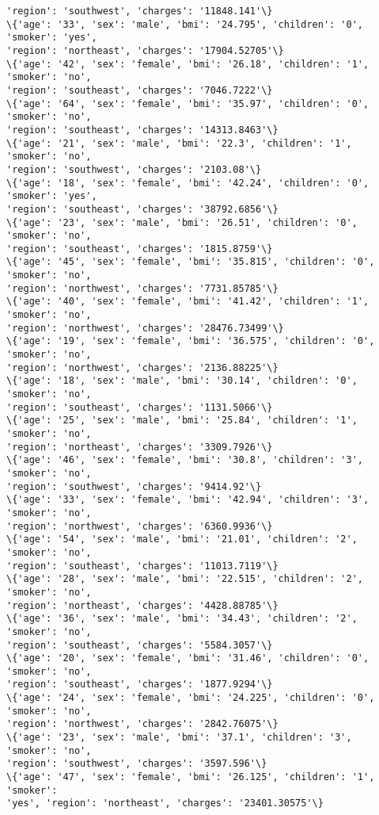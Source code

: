 \documentclass[11pt]{article}
\begin{document}
\begin{Verbatim}[commandchars=\\\{\}]
'region': 'southwest', 'charges': '11848.141'\}
\{'age': '33', 'sex': 'male', 'bmi': '24.795', 'children': '0', 'smoker': 'yes',
'region': 'northeast', 'charges': '17904.52705'\}
\{'age': '42', 'sex': 'female', 'bmi': '26.18', 'children': '1', 'smoker': 'no',
'region': 'southeast', 'charges': '7046.7222'\}
\{'age': '64', 'sex': 'female', 'bmi': '35.97', 'children': '0', 'smoker': 'no',
'region': 'southeast', 'charges': '14313.8463'\}
\{'age': '21', 'sex': 'male', 'bmi': '22.3', 'children': '1', 'smoker': 'no',
'region': 'southwest', 'charges': '2103.08'\}
\{'age': '18', 'sex': 'female', 'bmi': '42.24', 'children': '0', 'smoker': 'yes',
'region': 'southeast', 'charges': '38792.6856'\}
\{'age': '23', 'sex': 'male', 'bmi': '26.51', 'children': '0', 'smoker': 'no',
'region': 'southeast', 'charges': '1815.8759'\}
\{'age': '45', 'sex': 'female', 'bmi': '35.815', 'children': '0', 'smoker': 'no',
'region': 'northwest', 'charges': '7731.85785'\}
\{'age': '40', 'sex': 'female', 'bmi': '41.42', 'children': '1', 'smoker': 'no',
'region': 'northwest', 'charges': '28476.73499'\}
\{'age': '19', 'sex': 'female', 'bmi': '36.575', 'children': '0', 'smoker': 'no',
'region': 'northwest', 'charges': '2136.88225'\}
\{'age': '18', 'sex': 'male', 'bmi': '30.14', 'children': '0', 'smoker': 'no',
'region': 'southeast', 'charges': '1131.5066'\}
\{'age': '25', 'sex': 'male', 'bmi': '25.84', 'children': '1', 'smoker': 'no',
'region': 'northeast', 'charges': '3309.7926'\}
\{'age': '46', 'sex': 'female', 'bmi': '30.8', 'children': '3', 'smoker': 'no',
'region': 'southwest', 'charges': '9414.92'\}
\{'age': '33', 'sex': 'female', 'bmi': '42.94', 'children': '3', 'smoker': 'no',
'region': 'northwest', 'charges': '6360.9936'\}
\{'age': '54', 'sex': 'male', 'bmi': '21.01', 'children': '2', 'smoker': 'no',
'region': 'southeast', 'charges': '11013.7119'\}
\{'age': '28', 'sex': 'male', 'bmi': '22.515', 'children': '2', 'smoker': 'no',
'region': 'northeast', 'charges': '4428.88785'\}
\{'age': '36', 'sex': 'male', 'bmi': '34.43', 'children': '2', 'smoker': 'no',
'region': 'southeast', 'charges': '5584.3057'\}
\{'age': '20', 'sex': 'female', 'bmi': '31.46', 'children': '0', 'smoker': 'no',
'region': 'southeast', 'charges': '1877.9294'\}
\{'age': '24', 'sex': 'female', 'bmi': '24.225', 'children': '0', 'smoker': 'no',
'region': 'northwest', 'charges': '2842.76075'\}
\{'age': '23', 'sex': 'male', 'bmi': '37.1', 'children': '3', 'smoker': 'no',
'region': 'southwest', 'charges': '3597.596'\}
\{'age': '47', 'sex': 'female', 'bmi': '26.125', 'children': '1', 'smoker':
'yes', 'region': 'northeast', 'charges': '23401.30575'\}

\end{Verbatim}
\end{document}

